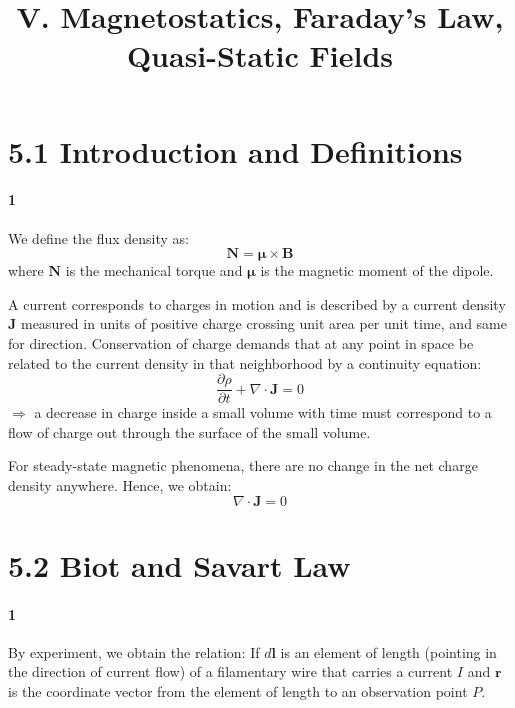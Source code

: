 \documentclass{article}
\author{}
\title{V. Magnetostatics, Faraday's Law, Quasi-Static Fields}
\date{}
\begin{document}
	\maketitle
	
	\section*{5.1 Introduction and Definitions}
	
	\paragraph{1}
	We define the flux density as:
	\begin{equation*}
		\mathbf{N} = \boldsymbol{\mu} \times \mathbf{B}
	\end{equation*}
	where $\mathbf{N}$ is the mechanical torque and $\boldsymbol{\mu}$ is the magnetic moment of the dipole.
	
	A current corresponds to charges in motion and is described by a current density $\mathbf{J}$ measured in units of positive charge crossing unit area per unit time, and same for direction. Conservation of charge demands that at any point in space be related to the current density in that neighborhood by a continuity equation:
	\begin{equation*}
		\frac{\partial \rho}{\partial t} + \nabla \cdot \mathbf{J} = 0
	\end{equation*}
	$\Rightarrow$ a decrease in charge inside a small volume with time must correspond to a flow of charge out through the surface of the small volume.
	
	For steady-state magnetic phenomena, there are no change in the net charge density anywhere. Hence, we obtain:
	\begin{equation*}
		\nabla \cdot \mathbf{J} = 0
	\end{equation*}
	
	\section*{5.2 Biot and Savart Law}
	
	\paragraph{1}
	By experiment, we obtain the relation:
	If $d\mathbf{l}$ is an element of length (pointing in the direction of current flow) of a filamentary wire that carries a current $I$ and $\mathbf{r}$ is the coordinate vector from the element of length to an observation point $P$. 
	
\end{document}

